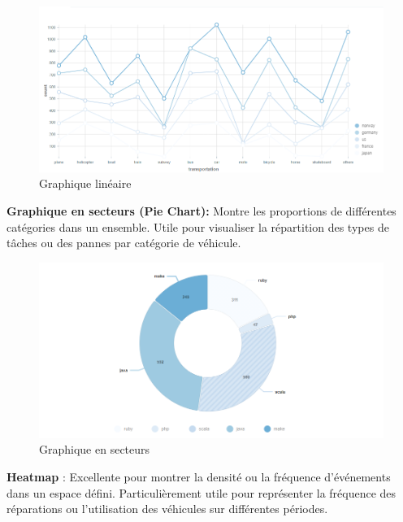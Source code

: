 \begin{figure}[ht]
    \centering \includegraphics[scale=0.6]{chap6.images/Line.png}
    \caption{Graphique linéaire}
    \label{Graphique linéaire}
\end{figure}

\noindent
\textbf{Graphique en secteurs (Pie Chart):} Montre les proportions de différentes catégories dans un ensemble. Utile pour visualiser la répartition des types de tâches ou des pannes par catégorie de véhicule.\\

\begin{figure}[ht]
    \centering \includegraphics[scale=0.6]{chap6.images/Pie.png}
    \caption{Graphique en secteurs}
    \label{Graphique en secteurs}
\end{figure}
\newpage
\noindent
\textbf{Heatmap} : Excellente pour montrer la densité ou la fréquence d'événements dans un espace défini. Particulièrement utile pour représenter la fréquence des réparations ou l'utilisation des véhicules sur différentes périodes.

